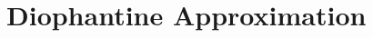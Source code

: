 \documentclass[../notes.tex]{subfiles}
\begin{document}
\section{Diophantine Approximation}
\end{document}
